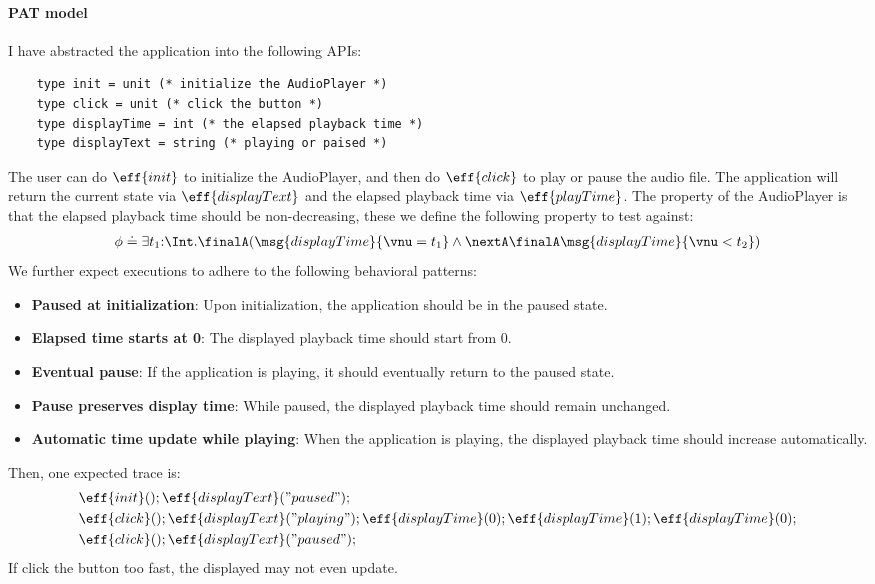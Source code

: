 \paragraph{PAT model} I have abstracted the application into the following APIs:
\begin{verbatim}
    type init = unit (* initialize the AudioPlayer *)
    type click = unit (* click the button *)
    type displayTime = int (* the elapsed playback time *)
    type displayText = string (* playing or paised *)
\end{verbatim}
The user can do $\eff{init}$ to initialize the AudioPlayer, and then do $\eff{click}$ to play or pause the audio file. The application will return the current state via $\eff{displayText}$ and the elapsed playback time via $\eff{playTime}$. The property of the AudioPlayer is that the elapsed playback time should be non-decreasing, these we define the following property to test against:
\begin{align*}
    \phi \doteq \exists t_1{:}\Int . \finalA (\msg{displayTime}{\vnu = t_1} \land \nextA \finalA \msg{displayTime}{\vnu < t_2})
\end{align*}\noindent
We further expect executions to adhere to the following behavioral patterns:
\begin{itemize}
    \item \textbf{Paused at initialization}: Upon initialization, the application should be in the paused state.
    \item \textbf{Elapsed time starts at 0}: The displayed playback time should start from 0.
    \item \textbf{Eventual pause}: If the application is playing, it should eventually return to the paused state.
    \item \textbf{Pause preserves display time}: While paused, the displayed playback time should remain unchanged.
    \item \textbf{Automatic time update while playing}: When the application is playing, the displayed playback time should increase automatically.
\end{itemize}

Then, one expected trace is:
\begin{align*}
    &\eff{init}();\eff{displayText}("paused");\\
    &\eff{click}();\eff{displayText}("playing");\eff{displayTime}(0);\eff{displayTime}(1);\eff{displayTime}(0);\\
    &\eff{click}();\eff{displayText}("paused");
\end{align*}\noindent
If click the button too fast, the displayed may not even update.

